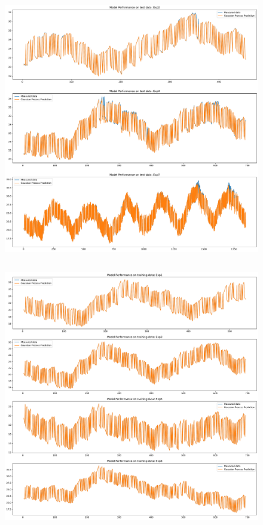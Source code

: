 \begin{figure}[ht]
    \centering
    \includegraphics[width = \textwidth]{Plots/GP_213_test_performance.pdf}
    \caption{}
    \label{fig:GP_213_test_validation}
\end{figure}

\clearpage

\subsection{\texorpdfstring{}{313}}

\begin{figure}[ht]
    \centering
    \includegraphics[width = \textwidth]{Plots/GP_313_training_performance.pdf}
    \caption{}
    \label{fig:GP_313_train_validation}
\end{figure}

